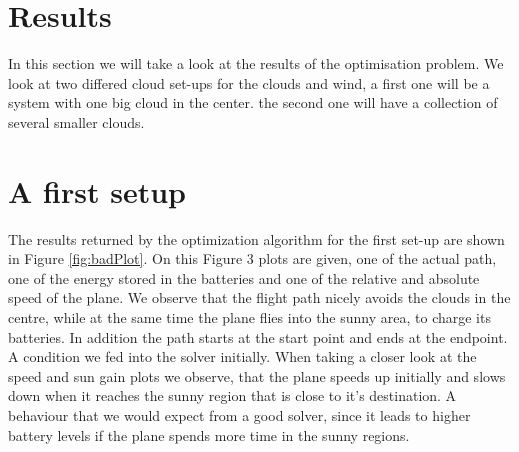\section{Results}

In this section we will take a look at the results of the optimisation problem.
We look at two differed cloud set-ups for the clouds and wind, a first one will be a system with one big cloud in the center. the second one will have a collection of several smaller clouds.


\section{A first setup}

The results returned by the optimization algorithm  for the first set-up are shown in Figure \ref{fig:badPlot}. 
On this Figure 3 plots are given, one of the actual path, one of the energy stored in the batteries and one of the relative and absolute speed of the plane.
We observe that the flight path nicely avoids the clouds in the centre, while at the same time the plane flies into the sunny area, to charge its batteries. In addition the path starts at the start point and ends at the endpoint. A condition we fed into the solver initially. 
 When taking a closer look at the speed and sun gain plots we observe, that the plane speeds up initially and slows down when it reaches the sunny region that is close to it's destination. A behaviour that we would expect from a good solver, since it leads to higher battery levels if the plane spends more time in the sunny regions.
